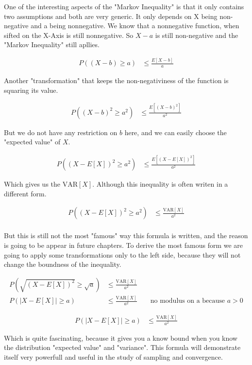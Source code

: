\documentclass[10pt,a4paper]{book}
\begin{document}
One of the interesting aspects of the "Markov Inequality" is that it only contains two assumptions and both are very generic. It only depends on X being non-negative and a being nonnegative. We know that a nonnegative function, when sifted on the X-Axis is still nonnegative. So $X-a$ is still non-negative and the "Markov Inequality" still apllies.

\begin{align*}
P((X-b) \ge a) &\le \frac{E[X-b]}{a}	
\end{align*}

Another "transformation" that keeps the non-negativiness of the function is squaring its value.

\begin{align*}
P((X-b)^2 \ge a^2) &\le \frac{E[(X-b)^2]}{a^2}	
\end{align*}

But we do not have any restriction on $b$ here, and we can easily choose the "expected value" of $X$.

\begin{align*}
P((X-E[X])^2 \ge a^2) &\le \frac{E[(X-E[X])^2]}{a^2}
\end{align*}

Which gives us the $\text{VAR}[X]$. Although this inequality is often writen in a different form.

\begin{align*}
P((X-E[X])^2 \ge a^2) &\le \frac{\text{VAR}[X]}{a^2}\\	
\end{align*}

But this is still not the most "famous" way this formula is written, and the reason is going to be appear in future chapters. To derive the most famous form we are going to apply some transformations only to the left side, because they will not change the boundness of the inequality.

\begin{align*}
P(\sqrt{(X-E[X])^2}\ge\sqrt{a}) &\le \frac{\text{VAR}[X]}{a^2}\\
P(|X-E[X]| \ge a) &\le \frac{\text{VAR}[X]}{a^2} && \text{ no modulus on a because } a>0
\end{align*}

\begin{align}
	P(|X-E[X]| \ge a) &\le \frac{\text{VAR}[X]}{a^2}
\end{align}

Which is quite fascinating, because it gives you a know bound when you know the distribution "expected value" and "variance". This formula will demonstrate itself very powerfull and useful in the study of sampling and convergence.
\end{document}

